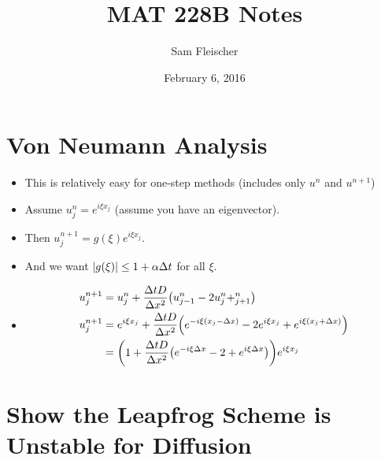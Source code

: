 \documentclass{article}
\title{MAT 228B Notes}
\author{Sam Fleischer}
\date{February 6, 2016}
\newcommand{\Dx}{\Delta x}
\newcommand{\Dt}{\Delta t}
\begin{document}
    \maketitle

    \section{Von Neumann Analysis}

        \begin{itemize}
            \item This is relatively easy for one-step methods (includes only $u^n$ and $u^{n+1}$)
            \item Assume $u_j^n = e^{i\xi x_j}$ (assume you have an eigenvector).
            \item Then $u_j^{n+1} = g(\xi)e^{i\xi x_j}$.
            \item And we want $\abs{g(\xi)} \leq 1 + \alpha\Dt$ for all $\xi$.
            \item 
            \begin{align*}
                u_j^{n+1} &= u_j^n + \frac{\Dt D}{\Dx^2}\qty(u_{j-1}^n - 2u_j^n + _{j+1}^n) \\
                u_j^{n+1} &= e^{i\xi x_j} + \frac{\Dt D}{\Dx^2}\qty(e^{-i\xi\qty(x_j - \Dx)} - 2e^{i\xi x_j} + e^{i\xi \qty(x_j + \Dx)}) \\
                &= \qty(1 + \frac{\Dt D}{\Dx^2}\qty(e^{-i\xi \Dx} - 2 + e^{i\xi\Dx}))e^{i\xi x_j}
            \end{align*}
        \end{itemize}

    \section{Show the Leapfrog Scheme is Unstable for Diffusion}
\end{document}
